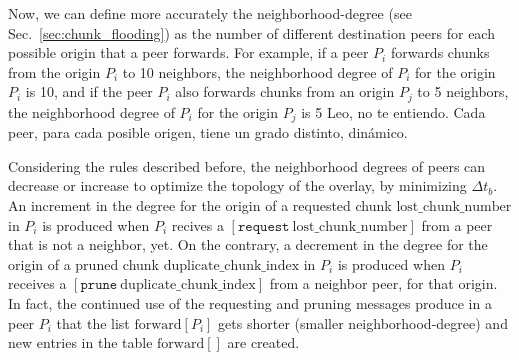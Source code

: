 Now, we can define more accurately the \gls{neighborhood-degree} (see
Sec.~\ref{sec:chunk_flooding}) as the number of different destination
peers for each possible origin that a peer forwards. For example, if a
peer $P_i$ forwards chunks from the origin $P_i$ to 10 neighbors, the
neighborhood degree of $P_i$ for the origin $P_i$ is 10, and if the
peer $P_i$ also forwards chunks from an origin $P_j$ to 5 neighbors,
the neighborhood degree of $P_i$ for the origin $P_j$ is 5
{\color{red} Leo, no te entiendo. Cada peer, para cada posible
  origen, tiene un grado distinto, dinámico}.

Considering the rules described before, the neighborhood degrees of
peers can decrease or increase to optimize the topology of the
overlay, by minimizing $\Delta t_b$. An increment in the degree for the origin of a requested
chunk $\text{lost\_chunk\_number}$ in $P_i$ is produced when $P_i$
recives a $[\mathtt{request}~\text{lost\_chunk\_number}]$ from a peer
that is not a neighbor, yet. On the contrary, a decrement in the
degree for the origin of a pruned chunk
$\text{duplicate\_chunk\_index}$ in $P_i$ is produced when $P_i$
receives a $[\mathtt{prune}~\text{duplicate\_chunk\_index}]$ from a
neighbor peer, for that origin. In fact, the continued use of the
requesting and pruning messages produce in a peer $P_i$ that the list
$\text{forward}[P_i]$ gets shorter (smaller \gls{neighborhood-degree})
and new entries in the table $\text{forward}[]$ are created.
